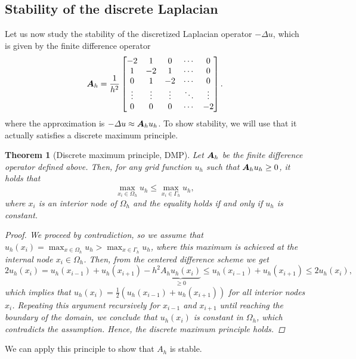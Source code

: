 \documentclass{article}
\newcommand{\mat}{\matrixsym}
\newtheorem{theorem}{Theorem}
\begin{document}
\subsection{Stability of the discrete Laplacian}
Let us now study the stability of the discretized Laplacian operator $-\Delta u$, which is given by the finite difference operator
$$\mat A_h = \frac{1}{h^2} \begin{bmatrix} -2 & 1 & 0 & \cdots & 0 \\ 1 & -2 & 1 & \cdots & 0 \\ 0 & 1 & -2 & \cdots & 0 \\ \vdots & \vdots & \vdots & \ddots & \vdots \\ 0 & 0 & 0 & \cdots & -2\end{bmatrix}.$$
where the approximation is $-\Delta u \approx \mat A_h u_h$. To show stability, we will use that it actually satisfies a discrete maximum principle. 
\begin{theorem}[Discrete maximum principle, DMP]
    Let $\mat A_h$ be the finite difference operator defined above. Then, for any grid function $u_h$ such that $\mat A_h u_h \geq 0$, it holds that
    $$ \max_{x_i\in \Omega_h} u_h \leq \max_{x_i\in \Gamma_h} u_h, $$
    where $x_i$ is an interior node of $\Omega_h$ and the equality holds if and only if $u_h$ is constant.
    \begin{proof}
        We proceed by contradiction, so we assume that $u_h(x_i) = \max_{x\in \Omega_h} u_h > \max_{x\in \Gamma_h} u_h$, where this maximum is achieved at the internal node $x_i\in \Omega_h$. Then, from the centered difference scheme we get
        $$2u_h(x_i) = u_h(x_{i-1}) + u_h(x_{i+1}) - h^2 \underbrace{A_h u_h(x_i)}_{\geq 0} \leq u_h(x_{i-1}) + u_h(x_{i+1}) \leq 2u_h(x_i),$$
        which implies that $u_h(x_i) = \frac{1}{2}(u_h(x_{i-1}) + u_h(x_{i+1}))$ for all interior nodes $x_i$. Repeating this argument recursively for $x_{i-1}$ and $x_{i+1}$ until reaching the boundary of the domain, we conclude that $u_h(x_i)$ is constant in $\Omega_h$, which contradicts the assumption. Hence, the discrete maximum principle holds.
    \end{proof}
\end{theorem}
We can apply this principle to show that $A_h$ is stable. 
\end{document}
